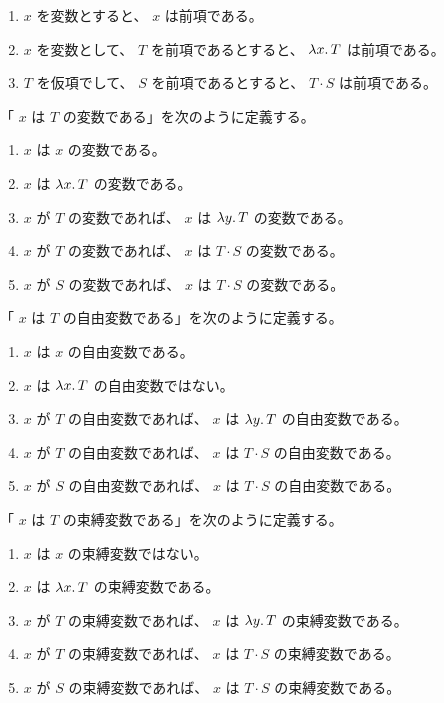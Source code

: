\documentclass[book]{jlreq}
\begin{document}
\begin{enumerate}
    \item \( x \) を変数とすると、 \( x \) は前項である。
    \item \( x \) を変数として、 \( T \) を前項であるとすると、 \( \lambda x \ldotp T \) は前項である。
    \item \( T \) を仮項でして、 \( S \) を前項であるとすると、 \( T \cdot S \) は前項である。
\end{enumerate}

「 \( x \) は \( T \) の変数である」を次のように定義する。

\begin{enumerate}
    \item \( x \) は \( x \) の変数である。
    \item \( x \) は \( \lambda x \ldotp T \) の変数である。
    \item \( x \) が \( T \) の変数であれば、 \( x \) は \( \lambda y \ldotp T \) の変数である。
    \item \( x \) が \( T \) の変数であれば、 \( x \) は \( T \cdot S \) の変数である。
    \item \( x \) が \( S \) の変数であれば、 \( x \) は \( T \cdot S \) の変数である。
\end{enumerate}

「 \( x \) は \( T \) の自由変数である」を次のように定義する。

\begin{enumerate}
    \item \( x \) は \( x \) の自由変数である。
    \item \( x \) は \( \lambda x \ldotp T \) の自由変数ではない。
    \item \( x \) が \( T \) の自由変数であれば、 \( x \) は \( \lambda y \ldotp T \) の自由変数である。
    \item \( x \) が \( T \) の自由変数であれば、 \( x \) は \( T \cdot S \) の自由変数である。
    \item \( x \) が \( S \) の自由変数であれば、 \( x \) は \( T \cdot S \) の自由変数である。
\end{enumerate}

「 \( x \) は \( T \) の束縛変数である」を次のように定義する。

\begin{enumerate}
    \item \( x \) は \( x \) の束縛変数ではない。
    \item \( x \) は \( \lambda x \ldotp T \) の束縛変数である。
    \item \( x \) が \( T \) の束縛変数であれば、 \( x \) は \( \lambda y \ldotp T \) の束縛変数である。
    \item \( x \) が \( T \) の束縛変数であれば、 \( x \) は \( T \cdot S \) の束縛変数である。
    \item \( x \) が \( S \) の束縛変数であれば、 \( x \) は \( T \cdot S \) の束縛変数である。
\end{enumerate}
\end{document}
